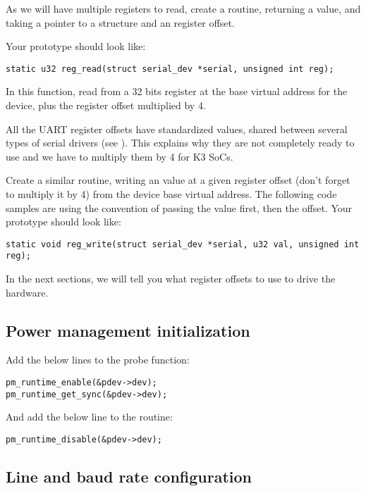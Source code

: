 As we will have multiple registers to read, create a 
routine, returning a  value, and taking a 
pointer to a  structure and an 
register offset.

Your prototype should look like:
\begin{verbatim}
static u32 reg_read(struct serial_dev *serial, unsigned int reg);
\end{verbatim}

In this function, read from a 32 bits register at the base virtual
address for the device, plus the register offset multiplied by 4.

All the UART register offsets have standardized values, shared between
several types of serial drivers (see
). This explains why they are not
completely ready to use and we have to multiply them by 4 for K3 SoCs.

Create a similar  routine, writing an 
value at a given register offset (don't forget to multiply it by 4) from
the device base virtual address. The following code samples are using
the  convention of passing the value first, then the
offset. Your prototype should look like:
\begin{verbatim}
static void reg_write(struct serial_dev *serial, u32 val, unsigned int reg);
\end{verbatim}

In the next sections, we will tell you what register offsets to use
to drive the hardware.

\subsection{Power management initialization}

Add the below lines to the probe function:

\begin{verbatim}
pm_runtime_enable(&pdev->dev);
pm_runtime_get_sync(&pdev->dev);
\end{verbatim}

And add the below line to the  routine:

\begin{verbatim}
pm_runtime_disable(&pdev->dev);
\end{verbatim}

\subsection{Line and baud rate configuration}


